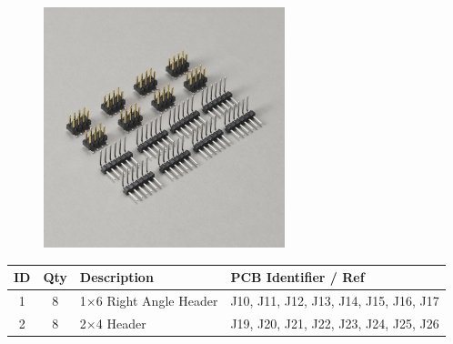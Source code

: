 \documentclass[12pt, a4paper]{article}
\newcommand{\drawrect}[2]{
    \draw[black, line width=2pt, rounded corners=3] (#1) rectangle (#2);
    \draw[white, line width=1pt, rounded corners=3] (#1) rectangle (#2);
}
\newcommand{\drawtext}[2]{
    \node[white] at (#1) {\contourlength{.075em}\contour{black}{#2}};
}
\begin{document}
\begin{figure}[H]
    \centering
    \hspace{2mm}
    \includegraphics[width=7cm]{images/20_02_breadboard_headers_sideview.jpg}
\end{figure}

\begin{center}
    \small
    \setlength\extrarowheight{4pt}
    \begin{tabularx}{\textwidth}{|c|c|X|l|}
        \hline \rowcolor{lightgray} ID & Qty & Description & PCB Identifier / Ref\\
        \hline 1 & 8 & 1×6 Right Angle Header & J10, J11, J12, J13, J14, J15, J16, J17\\
        \hline 2 & 8 & 2×4 Header & J19, J20, J21, J22, J23, J24, J25, J26\\
        \hline
    \end{tabularx}
\end{center}
\end{document}
